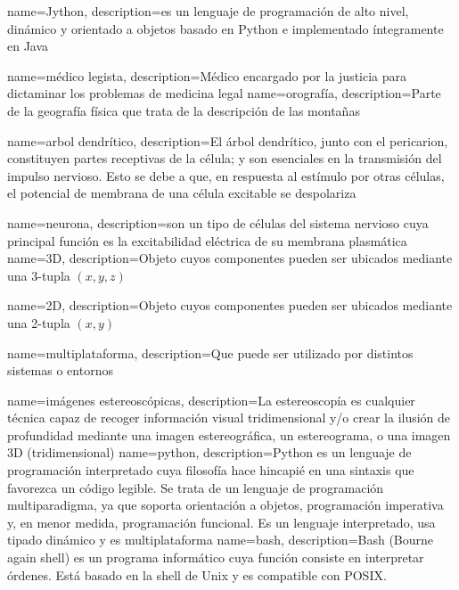 {
	name=Jython,
	description={es un lenguaje de programación de alto nivel, dinámico y orientado a objetos basado en Python e implementado íntegramente en Java} 
}



{
	name=médico legista,
	description={Médico encargado por la justicia para dictaminar los problemas de medicina legal} 
}
{
	name=orografía,
	description={Parte de la geografía física que trata de la descripción de las montañas} 
}

{
	name=arbol dendrítico,
	description={El árbol dendrítico, junto con el pericarion, constituyen partes receptivas de la célula; y son esenciales en la transmisión del impulso nervioso. Esto se debe a que, en respuesta al estímulo por otras células, el potencial de membrana de una célula excitable se despolariza} 
}


{
	name=neurona,
	description={son un tipo de células del sistema nervioso cuya principal función es la excitabilidad eléctrica de su membrana plasmática} 
}
{
	name=3D,
	description={Objeto cuyos componentes pueden ser ubicados mediante una 3-tupla $(x,y,z)$} 
}


{
	name=2D,
	description={Objeto cuyos componentes pueden ser ubicados mediante una 2-tupla $(x,y)$} 
}

{
	name=multiplataforma,
	description={Que puede ser utilizado por distintos sistemas o entornos} 
}

{
	name=imágenes estereoscópicas,
	description={La estereoscopía es cualquier técnica capaz de recoger información visual tridimensional y/o crear la ilusión de profundidad mediante una imagen estereográfica, un estereograma, o una imagen \gls{3D} (tridimensional)} 
}
{
	name=python,
	description={Python es un lenguaje de programación interpretado cuya filosofía hace hincapié en una sintaxis que favorezca un código legible. Se trata de un lenguaje de programación multiparadigma, ya que soporta orientación a objetos, programación imperativa y, en menor medida, programación funcional. Es un lenguaje interpretado, usa tipado dinámico y es multiplataforma} 
} 
{
	name=bash,
	description={Bash (Bourne again shell) es un programa informático cuya función consiste en interpretar órdenes. Está basado en la shell de Unix y es compatible con POSIX.} 
} 


